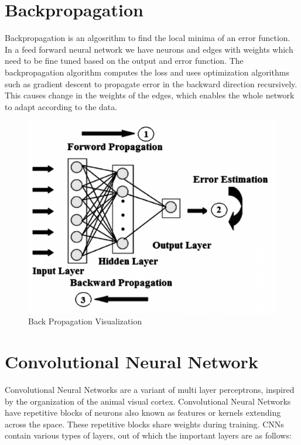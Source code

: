 \section{Backpropagation}
 Backpropagation \cite{rumelhart1988learning} is an algosrithm to find the local minima of an error function. In a feed forward neural network we have neurons and edges with weights which need to be fine tuned based on the output and error function.  The backpropagation algorithm computes the loss and uses  optimization algorithms such as gradient descent to propagate error in the backward direction recursively. This causes change in the weights of the edges, which enables the whole network to adapt according to the data.  
\begin{figure}[H]
  \centering
    \includegraphics[scale=.4, angle=0]{Files/BackPropagation.png}
    \caption[Back Propagation Visualization]{Back Propagation Visualization \cite{backprop}}
    \label{fig:backpropogation}
\end{figure}

\section{Convolutional Neural Network}

Convolutional Neural Networks are a variant of multi layer perceptrons, inspired by the organization of the animal visual cortex. Convolutional Neural Networks have repetitive blocks of neurons also known as features or kernels extending across the space. These repetitive blocks share weights during training. CNNs contain various types of layers, out of which the important layers are  as follows:

